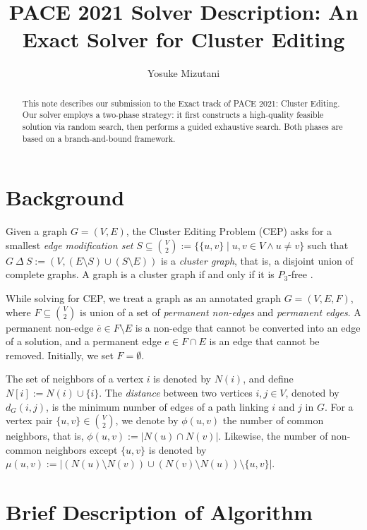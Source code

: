 \documentclass[a4paper,UKenglish,cleveref, autoref, thm-restate]{lipics-v2021}
\title{PACE 2021 Solver Description: An Exact Solver for Cluster Editing} %
\author{Yosuke Mizutani}{School of Computing, University of Utah, USA}{yos@cs.utah.edu}{}{}%
\begin{document}
\maketitle

\begin{abstract}
This note describes our submission to the Exact track of PACE 2021: Cluster Editing. Our solver employs a two-phase strategy: it first constructs a high-quality feasible solution via  random search, then performs a guided exhaustive search. Both phases are based on a branch-and-bound framework.
\end{abstract}

\section{Background}
\label{sec:typesetting-summary}

Given a graph $G=(V,E)$, the Cluster Editing Problem (CEP) asks for a smallest \textit{edge modification set} $S \subseteq \binom{V}{2} := \{\{u,v\} \mid u,v \in V \wedge u \neq v\}$ such that $G \ \Delta\ S := (V,(E \setminus S) \cup (S \setminus E))$ is a \textit{cluster graph}, that is, a disjoint union of complete graphs. A graph is a cluster graph if and only if it is $P_3$-free \cite{shamir2004cluster}.

While solving for CEP, we treat a graph as an annotated graph $G=(V,E,F)$, where $F \subseteq \binom{V}{2}$ is union of a set of \textit{permanent non-edges} and \textit{permanent edges}. A permanent non-edge $\overline{e} \in F \setminus E$ is a non-edge that cannot be converted into an edge of a solution, and a permanent edge $e \in F \cap E$ is an edge that cannot be removed. Initially, we set $F=\emptyset$.

The set of neighbors of a vertex $i$ is denoted by $N(i)$, and define $N[i] := N(i) \cup \{i\}$. The \textit{distance} between two vertices $i,j\in V$, denoted by $d_G(i,j)$, is the minimum number of edges of a path linking $i$ and $j$ in $G$. For a vertex pair $\{u,v\} \in \binom{V}{2}$, we denote by $\phi(u,v)$ the number of common neighbors, that is, $\phi(u,v):=|N(u)\cap N(v)|$. Likewise, the number of non-common neighbors except $\{u,v\}$ is denoted by $\mu(u,v):=|(N(u)\setminus N(v)) \cup (N(v)\setminus N(u))\setminus \{u,v\}|$.

\section{Brief Description of Algorithm}
\end{document}
